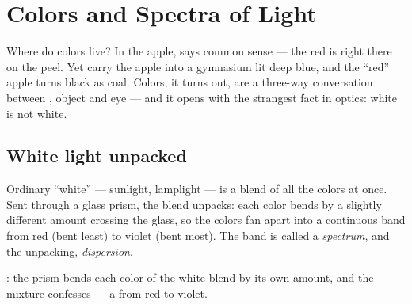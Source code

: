 \chapter{Colors and Spectra of Light}\label{ch:g8:colors-spectra}

Where do colors live? In the apple, says common sense --- the
red is right there on the peel. Yet carry the apple into a
gymnasium lit deep blue, and the ``red'' apple turns black as
coal. Colors, it turns out, are a three-way conversation between
, object and eye --- and it opens with the strangest fact
in optics: white  is not white.

\section{White light unpacked}

\begin{proposition}\label{prop:g8:colors-spectra:mixture}
Ordinary ``white''  --- sunlight, lamplight --- is a
blend of all the colors at once. Sent through a glass prism,
the blend unpacks: each color bends by a slightly different
amount crossing the glass, so the colors fan apart into a
continuous band from red (bent least) to violet (bent most).
The band is called a \emph{spectrum}, and the
unpacking, \emph{dispersion}.
\end{proposition}

\begin{omfigure}

{\small {}: the prism bends each color of the white
blend by its own amount, and the mixture confesses --- a
 from red to violet.}
\end{omfigure}

